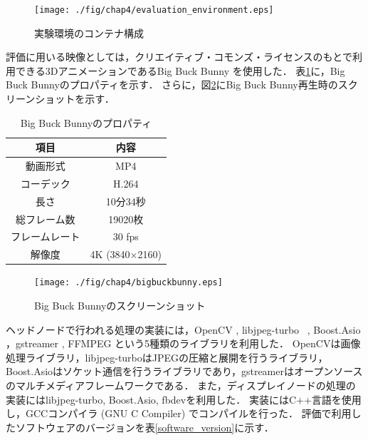 \begin{figure}[H]
    \hspace*{\fill}
    \texttt{[image: ./fig/chap4/evaluation\_environment.eps]}
    \hspace*{\fill}
    \caption{実験環境のコンテナ構成}
    \label{evaluation_environment}
\end{figure}

評価に用いる映像としては，クリエイティブ・コモンズ・ライセンスのもとで利用できる3DアニメーションであるBig Buck Bunny \cite{bigbackbunny}を使用した．
表\ref{bigbuckbunny}に，Big Buck Bunnyのプロパティを示す．
さらに，図\ref{bbb_screenshot}にBig Buck Bunny再生時のスクリーンショットを示す．

\begin{table}[H]
    \caption{Big Buck Bunnyのプロパティ}
    \begin{center}
    \begin{tabular}{cc}
    \hline
    項目 & 内容 \\\hline\hline
    動画形式　& MP4 \\ \hline
    コーデック & H.264 \cite{h264} \\ \hline
    長さ & 10分34秒 \\ \hline
    総フレーム数 & 19020枚 \\ \hline
    フレームレート & 30 fps \\ \hline
    解像度 & 4K (3840×2160) \\ \hline
    \end{tabular}
    \label{bigbuckbunny}
    \end{center}
\end{table}

\begin{figure}[H]
    \hspace*{\fill}
    \texttt{[image: ./fig/chap4/bigbuckbunny.eps]}
    \hspace*{\fill}
    \caption{Big Buck Bunnyのスクリーンショット}
    \label{bbb_screenshot}
   \end{figure}

ヘッドノードで行われる処理の実装には，OpenCV \cite{opencv}, libjpeg-turbo ~\cite{libjpeg}, Boost.Asio \cite{asio}，gstreamer \cite{gstreamer} , FFMPEG \cite{ffmpeg}という5種類のライブラリを利用した． 
OpenCVは画像処理ライブラリ，libjpeg-turboはJPEGの圧縮と展開を行うライブラリ，Boost.Asioはソケット通信を行うライブラリであり，gstreamerはオープンソースのマルチメディアフレームワークである．
また，ディスプレイノードの処理の実装にはlibjpeg-turbo, Boost.Asio, fbdevを利用した．
実装にはC++言語を使用し，GCCコンパイラ (GNU C Compiler) \cite{gcc}でコンパイルを行った．
評価で利用したソフトウェアのバージョンを表\ref{software_version}に示す．

